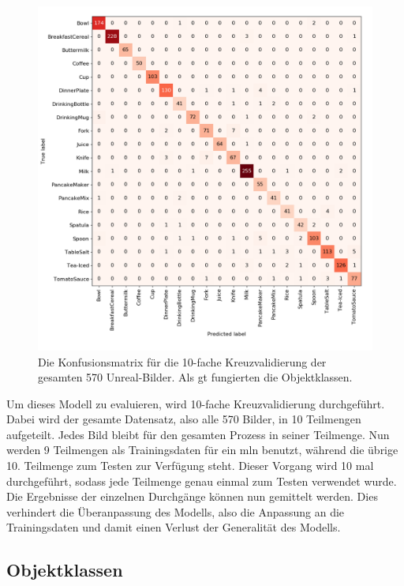 \begin{figure}
\centering
	\includegraphics[scale=.315]{img/chapter6/UnrealGTClass.png}
\caption[Konfusionsmatrix des gesamten Unreal-Bilder Datensatzes mit Objektklassen als GT]{Die Konfusionsmatrix für die 10-fache Kreuzvalidierung der gesamten 570 Unreal-Bilder. Als \gls{gt} fungierten die Objektklassen.}
\label{fig:UnrealGTClass_confMatrix}
\end{figure}

Um dieses Modell zu evaluieren, wird 10-fache Kreuzvalidierung durchgeführt. Dabei wird der gesamte Datensatz, also alle 570 Bilder, in 10 Teilmengen aufgeteilt. Jedes Bild bleibt für den gesamten Prozess in seiner Teilmenge. Nun werden 9 Teilmengen als Trainingsdaten für ein \gls{mln} benutzt, während die übrige 10. Teilmenge zum Testen zur Verfügung steht. Dieser Vorgang wird 10 mal durchgeführt, sodass jede Teilmenge genau einmal zum Testen verwendet wurde. Die Ergebnisse der einzelnen Durchgänge können nun gemittelt werden. Dies verhindert die Überanpassung des Modells, also die Anpassung an die Trainingsdaten und damit einen Verlust der Generalität des Modells. \par

\subsection{Objektklassen}

